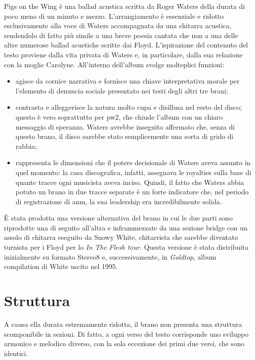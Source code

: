 \documentclass[class=book, crop=false, oneside, 12pt]{standalone}
\begin{document}
    Pigs on the Wing è una ballad acustica scritta da Roger Waters della durata di poco meno di un minuto e mezzo. L'arrangiamento è essenziale e ridotto esclusivamente alla voce di Waters accompagnata da una chitarra acustica, rendendolo di fatto più simile a una breve poesia cantata che non a una delle altre numerose ballad acustiche scritte dai Floyd. L'ispirazione del contenuto del testo proviene dalla vita privata di Waters e, in particolare, dalla sua relazione con la moglie Carolyne\cite{schaffner1992saucerful}. All'interno dell'album svolge molteplici funzioni: 
    \begin{itemize}
        \item agisce da cornice narrativa e fornisce una chiave interpretativa morale per l'elemento di denuncia sociale presentato nei testi degli altri tre brani;
        \item contrasta e alleggerisce la natura molto cupa e disillusa nel resto del disco; questo è vero soprattutto per \acrshort{pw2}, che chiude l'album con un chiaro messaggio di speranza. Waters avrebbe inseguito affermato che, senza di questo brano, il disco sarebbe stato semplicemente una sorta di grido di rabbia\cite{schaffner1992saucerful};
        \item rappresenta le dimensioni che il potere decisionale di Waters aveva assunto in quel momento: la casa discografica, infatti,  assegnava le royalties sulla base di quante tracce ogni musicista aveva inciso. Quindi, il fatto che Waters abbia potuto un brano in due tracce separate è un forte indicatore che, nel periodo di registrazione di \acrshort{anm}, la sua leadership era incredibilmente solida.
    \end{itemize}
 
    È stata prodotta una versione alternativa del brano in cui le due parti sono riprodotte una di seguito all'altra e inframmezzate da una sezione bridge con un assolo di chitarra eseguito da Snowy White, chitarrista che sarebbe diventato turnista per i Floyd per lo \emph{In The Flesh tour}. Questa versione è stata distribuita inizialmente su formato Stereo8 e, successivamente, in \emph{Goldtop}, album compilation di White uscito nel 1995.
    
    \section{Struttura}
    \label{sec:03-structure}
    A causa ella durata estremamente ridotta, il brano non presenta una struttura scomponibile in sezioni. Di fatto, a ogni verso del testo corrisponde uno sviluppo armonico e melodico diverso, con la sola eccezione dei primi due versi, che sono identici. 
    
\end{document}
